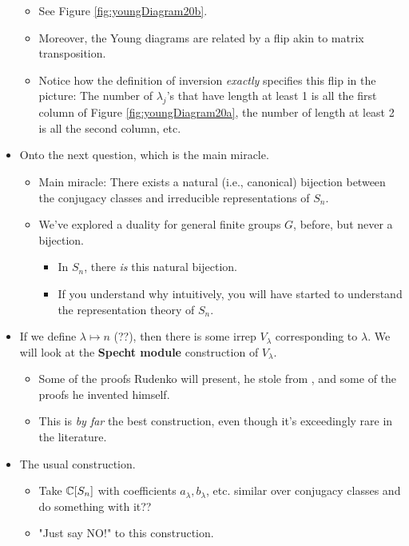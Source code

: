 \documentclass[../notes.tex]{subfiles}
\begin{document}
\begin{itemize}
\begin{itemize}
        \item See Figure \ref{fig:youngDiagram20b}.
        \item Moreover, the Young diagrams are related by a flip akin to matrix transposition.
        \item Notice how the definition of inversion \emph{exactly} specifies this flip in the picture: The number of $\lambda_j$'s that have length at least 1 is all the first column of Figure \ref{fig:youngDiagram20a}, the number of length at least 2 is all the second column, etc.
    \end{itemize}
    \item Onto the next question, which is the main miracle.
    \begin{itemize}
        \item Main miracle: There exists a natural (i.e., canonical) bijection between the conjugacy classes and irreducible representations of $S_n$.
        \item We've explored a duality for general finite groups $G$, before, but never a bijection.
        \begin{itemize}
            \item In $S_n$, there \emph{is} this natural bijection.
            \item If you understand why intuitively, you will have started to understand the representation theory of $S_n$.
        \end{itemize}
    \end{itemize}
    \item If we define $\lambda\mapsto n$ (??), then there is some irrep $V_\lambda$ corresponding to $\lambda$. We will look at the \textbf{Specht module} construction of $V_\lambda$.
    \begin{itemize}
        \item Some of the proofs Rudenko will present, he stole from \textcite{bib:Etingof}, and some of the proofs he invented himself.
        \item This is \emph{by far} the best construction, even though it's exceedingly rare in the literature.
    \end{itemize}
    \item The usual construction.
    \begin{itemize}
        \item Take $\mathbb{C}[S_n]$ with coefficients $a_\lambda,b_\lambda$, etc. similar over conjugacy classes and do something with it??
        \item "Just say NO!" to this construction.

\end{itemize}
\end{itemize}
\end{document}
